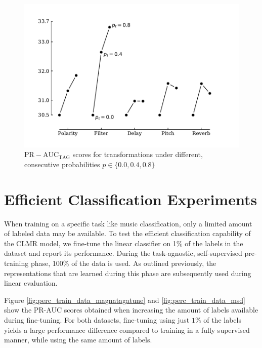 \begin{figure}[h]
    \centering
    \includegraphics[width=\columnwidth]{figs/transformation_probabilities.pdf}
    \caption[-5cm]{$\mathrm{PR-AUC}_{\mathrm{TAG}}$ scores for transformations under different, consecutive probabilities $p \in \{ 0.0, 0.4, 0.8 \}$}
    \label{fig:transformation_probabilities}
\end{figure}


\section{Efficient Classification Experiments}
When training on a specific task like music classification, only a limited amount of labeled data may be available. To test the efficient classification capability of the CLMR model, we fine-tune the linear classifier on 1\% of the labels in the dataset and report its performance. During the task-agnostic, self-supervised pre-training phase, 100\% of the data is used. As outlined previously, the representations that are learned during this phase are subsequently used during linear evaluation.

Figure \ref{fig:perc_train_data_magnatagatune} and \ref{fig:perc_train_data_msd} show the PR-AUC scores obtained when increasing the amount of labels available during fine-tuning.
For both datasets, fine-tuning using just $1\%$ of the labels yields a large performance difference compared to training in a fully supervised manner, while using the same amount of labels.

